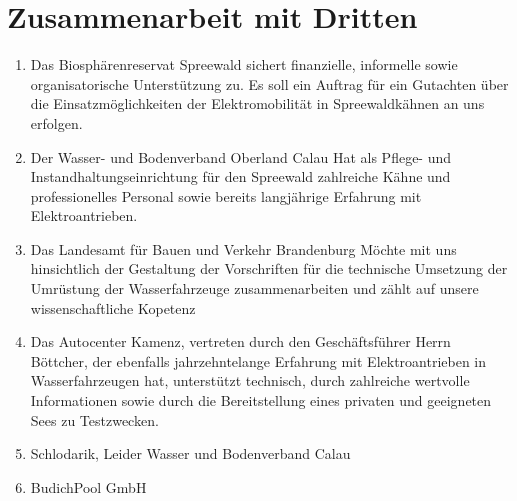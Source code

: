 
\chapter{Zusammenarbeit mit Dritten}
\label{sec:ZusammenarbeitMitDritten}


\begin{enumerate}


\item	Das Biosphärenreservat Spreewald sichert finanzielle, informelle sowie organisatorische Unterstützung zu.
Es soll ein Auftrag für ein Gutachten über die Einsatzmöglichkeiten der Elektromobilität in Spreewaldkähnen an uns erfolgen.

\item	Der Wasser- und Bodenverband Oberland Calau Hat als Pflege- und Instandhaltungseinrichtung für den Spreewald zahlreiche Kähne und professionelles Personal sowie bereits langjährige Erfahrung mit Elektroantrieben.

\item	Das Landesamt für Bauen und Verkehr Brandenburg Möchte mit uns hinsichtlich der Gestaltung der Vorschriften für die technische Umsetzung der Umrüstung der Wasserfahrzeuge zusammenarbeiten und zählt auf unsere wissenschaftliche Kopetenz


\item	Das Autocenter Kamenz, vertreten durch den Geschäftsführer Herrn Böttcher, der ebenfalls jahrzehntelange Erfahrung mit Elektroantrieben in Wasserfahrzeugen hat, unterstützt technisch, durch zahlreiche wertvolle Informationen sowie durch die Bereitstellung eines privaten und geeigneten Sees zu Testzwecken.
\item Schlodarik, Leider Wasser und Bodenverband Calau
\item BudichPool GmbH
	
\end{enumerate}

